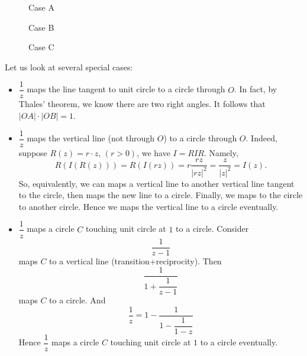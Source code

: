 \documentclass[12pt,reqno]{article}
\theoremstyle{definition}
\begin{document}
 
\begin{figure}
\centering
\begin{minipage}{.3\textwidth}
  \centering
\caption{Case A}
\end{minipage}%
\begin{minipage}{.3\textwidth}
  \centering
  \caption{Case B}
\end{minipage}%
\begin{minipage}{.3\textwidth}
  \centering
  \caption{Case C}
\end{minipage}
\end{figure}

 Let us look at several special cases:
 
\begin{itemize}
     \item $\dfrac{1}{z}$ maps the line tangent to unit circle to a circle through $O$. In fact, by Thales' theorem, we know there are two right angles. It follows that $|OA|\cdot |OB|=1$.
     \item $\dfrac{1}{z}$ maps the vertical line (not through $O$) to a circle through $O$. Indeed, suppose $R(z)=r\cdot z$, $(r>0)$, we have $I=RIR$. Namely,
     \[R(I(R(z)))=R(I(rz))=r\frac{rz}{|rz|^2}=\frac{z}{|z|^2}=I(z).\]
     So, equivalently, we can maps a vertical line to another vertical line tangent to the circle, then maps the new line to a circle. Finally, we maps to the circle to another circle. Hence we maps the vertical line to a circle eventually.
     \item $\dfrac{1}{z}$ maps a circle $C$ touching unit circle at $1$ to a circle. Consider 
     \[\frac{1}{z-1}\]
     maps $C$ to a vertical line (transition+reciprocity). Then
     \[\dfrac{1}{1+\dfrac{1}{z-1}}\]
     maps $C$ to a circle. And 
     \[\frac{1}{z}=1-\dfrac{1}{1-\dfrac{1}{1-z}}\]
     Hence $\dfrac{1}{z}$ maps a circle $C$ touching unit circle at $1$ to a circle eventually.
 \end{itemize}
 
\end{document}
